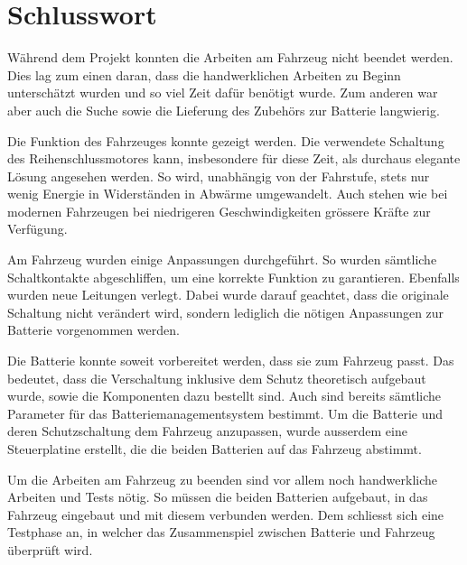 \chapter{Schlusswort}
Während dem Projekt konnten die Arbeiten am Fahrzeug nicht beendet werden. Dies lag zum einen daran, dass die handwerklichen Arbeiten zu Beginn unterschätzt wurden und so viel Zeit dafür benötigt wurde. Zum anderen war aber auch die Suche sowie die Lieferung des Zubehörs zur Batterie langwierig.

Die Funktion des Fahrzeuges konnte gezeigt werden. Die verwendete Schaltung des Reihenschlussmotores kann, insbesondere für diese Zeit, als durchaus elegante Lösung angesehen werden. So wird, unabhängig von der Fahrstufe, stets nur wenig Energie in Widerständen in Abwärme umgewandelt. Auch stehen wie bei modernen Fahrzeugen bei niedrigeren Geschwindigkeiten grössere Kräfte zur Verfügung.

Am Fahrzeug wurden einige Anpassungen durchgeführt. So wurden sämtliche Schaltkontakte abgeschliffen, um eine korrekte Funktion zu garantieren. Ebenfalls wurden neue Leitungen verlegt. Dabei wurde darauf geachtet, dass die originale Schaltung nicht verändert wird, sondern lediglich die nötigen Anpassungen zur Batterie vorgenommen werden.

Die Batterie konnte soweit vorbereitet werden, dass sie zum Fahrzeug passt. Das bedeutet, dass die Verschaltung inklusive dem Schutz theoretisch aufgebaut wurde, sowie die Komponenten dazu bestellt sind. Auch sind bereits sämtliche Parameter für das Batteriemanagementsystem bestimmt. Um die Batterie und deren Schutzschaltung dem Fahrzeug anzupassen, wurde ausserdem eine Steuerplatine erstellt, die die beiden Batterien auf das Fahrzeug abstimmt.

Um die Arbeiten am Fahrzeug zu beenden sind vor allem noch handwerkliche Arbeiten und Tests nötig. So müssen die beiden Batterien aufgebaut, in das Fahrzeug eingebaut und mit diesem verbunden werden. Dem schliesst sich eine Testphase an, in welcher das Zusammenspiel zwischen Batterie und Fahrzeug überprüft wird.